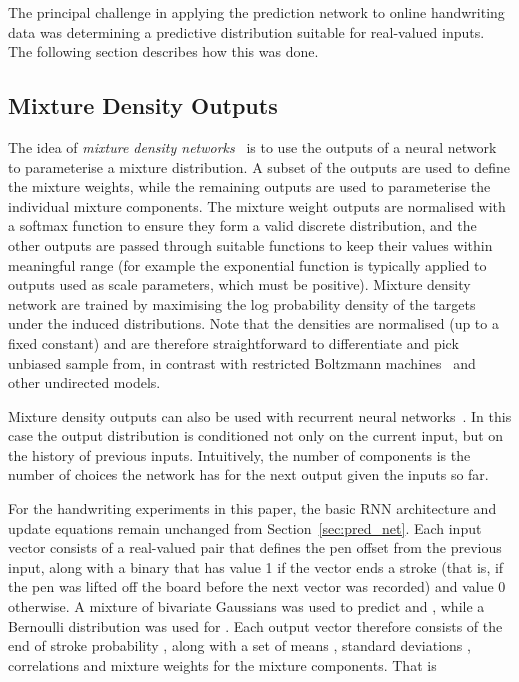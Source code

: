 \documentclass{article}
\newcommand{\sref}[1]{Section~\ref{sec:#1}}
\begin{document}
The principal challenge in applying the prediction network to online handwriting data was determining a predictive distribution suitable for real-valued inputs.
The following section describes how this was done.

\subsection{Mixture Density Outputs}
The idea of \emph{mixture density networks}~\cite{bishop94mixture,bishop95book} is to use the outputs of a neural network to parameterise a mixture distribution.
A subset of the outputs are used to define the mixture weights, while the remaining outputs are used to parameterise the individual mixture components.
The mixture weight outputs are normalised with a softmax function to ensure they form a valid discrete distribution, and the other outputs are passed through suitable functions to keep their values within meaningful range (for example the exponential function is typically applied to outputs used as scale parameters, which must be positive).
Mixture density network are trained by maximising the log probability density of the targets under the induced distributions.
Note that the densities are normalised (up to a fixed constant) and are therefore straightforward to differentiate and pick unbiased sample from, in contrast with restricted Boltzmann machines~\cite{hinton10rbm} and other undirected models.

Mixture density outputs can also be used with recurrent neural networks~\cite{schuster99mixture}.
In this case the output distribution is conditioned not only on the current input, but on the history of previous inputs.
Intuitively, the number of components is the number of choices the network has for the next output given the inputs so far.

For the handwriting experiments in this paper, the basic RNN architecture and update equations remain unchanged from \sref{pred_net}. 
Each input vector  consists of a real-valued pair  that defines the pen offset from the previous input, along with a binary  that has value 1 if the vector ends a stroke (that is, if the pen was lifted off the board before the next vector was recorded) and value 0 otherwise.
A mixture of bivariate Gaussians was used to predict  and , while a Bernoulli distribution was used for .
Each output vector  therefore consists of the end of stroke probability , along with a set of means , standard deviations , correlations  and mixture weights  for the  mixture components.
That is
 
\end{document}
